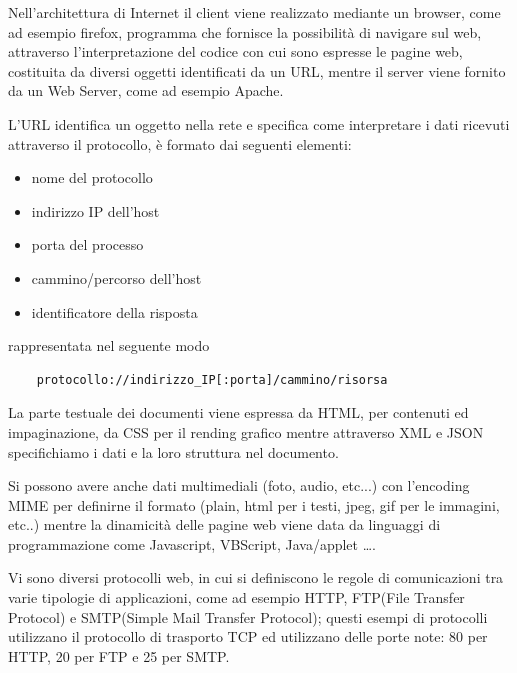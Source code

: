 \message{ !name(sd.tex)}\documentclass[a4paper,12pt, oneside]{book}
\begin{document}
Nell'architettura di Internet il client viene realizzato mediante un browser, come ad esempio firefox,
programma che fornisce la possibilità di navigare sul web, attraverso l'interpretazione del codice
con cui sono espresse le pagine web, costituita da diversi oggetti identificati da un URL, mentre
il server viene fornito da un Web Server, come ad esempio Apache.

L'URL identifica un oggetto nella rete e specifica come interpretare i dati ricevuti 
attraverso il protocollo, è formato dai seguenti elementi:
\begin{itemize}
    \item nome del protocollo 
    \item indirizzo IP dell'host
    \item porta del processo
    \item cammino/percorso dell'host
    \item identificatore della risposta
\end{itemize}
rappresentata nel seguente modo
\begin{verbatim}
    protocollo://indirizzo_IP[:porta]/cammino/risorsa
\end{verbatim}
La parte testuale dei documenti viene espressa da HTML, per contenuti ed impaginazione, da CSS per 
il rending grafico mentre attraverso XML e JSON specifichiamo i dati e la loro struttura nel documento.

Si possono avere anche dati multimediali (foto, audio, etc...) con l'encoding MIME per definirne 
il formato (plain, html per i testi, jpeg, gif per le immagini, etc..) mentre la dinamicità delle pagine web
viene data da linguaggi di programmazione come Javascript, VBScript, Java/applet \dots .

Vi sono diversi protocolli web, in cui si definiscono le regole di comunicazioni tra varie tipologie di
applicazioni, come ad esempio HTTP, FTP(File Transfer Protocol) e SMTP(Simple Mail Transfer Protocol);
questi esempi di protocolli utilizzano il protocollo di trasporto TCP ed utilizzano delle porte note:
80 per HTTP, 20 per FTP e 25 per SMTP.
\end{document}
